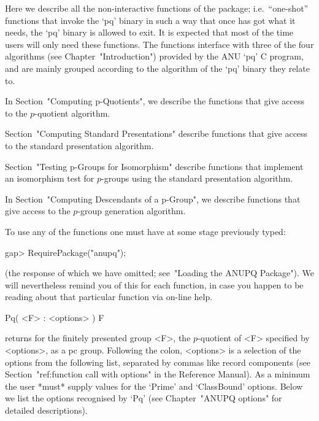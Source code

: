 

Here we describe  all  the  non-interactive  functions  of  the  {\ANUPQ}
package; i.e.~``one-shot'' functions that invoke the `pq' binary in  such
a way that once {\GAP} has got what it needs, the `pq' binary is  allowed
to exit. It is expected that most of the time users will only need  these
functions. The functions interface with three of the four algorithms (see
Chapter~"Introduction") provided by the  ANU  `pq'  C  program,  and  are
mainly grouped according to the algorithm of the `pq' binary they  relate
to.

In Section~"Computing p-Quotients", we describe the functions  that  give
access to the $p$-quotient algorithm.

Section~"Computing Standard Presentations" describe functions  that  give
access to the standard presentation algorithm.

Section~"Testing  p-Groups  for  Isomorphism"  describe  functions   that
implement  an  isomorphism  test  for  $p$-groups  using   the   standard
presentation algorithm.

In Section~"Computing Descendants of a p-Group",  we  describe  functions
that give access to the $p$-group generation algorithm.

To use any of the functions one must have at some stage previously typed:

\beginexample
gap> RequirePackage("anupq");
\endexample

(the response of which we have omitted; see~"Loading the ANUPQ Package").
We will nevertheless remind you of this for each function,  in  case  you
happen to be reading about that particular function via on-line help.


\>Pq( <F> : <options> ) F

returns for the finitely presented group <F>,  the  $p$-quotient  of  <F>
specified by <options>, as a pc group. Following the colon, <options>  is
a selection of the options from the following list, separated  by  commas
like record components (see Section~"ref:function call with  options"  in
the {\GAP} Reference Manual). As a minimum the user *must* supply  values
for the `Prime' and `ClassBound'  options.  Below  we  list  the  options
recognised  by   `Pq'   (see   Chapter~"ANUPQ   options"   for   detailed
descriptions).

